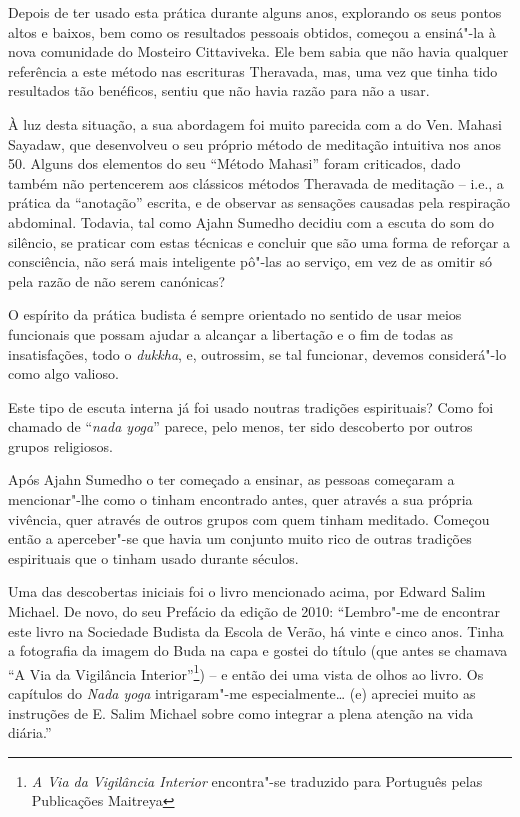 Depois de ter usado esta prática durante alguns anos, explorando os seus
pontos altos e baixos, bem como os resultados pessoais obtidos, começou
a ensiná"-la à nova comunidade do Mosteiro Cittaviveka. Ele bem sabia que
não havia qualquer referência a este método nas escrituras Theravada,
mas, uma vez que tinha tido resultados tão benéficos, sentiu que não
havia razão para não a usar.

À luz desta situação, a sua abordagem foi muito parecida com a do Ven.
Mahasi Sayadaw, que desenvolveu o seu próprio método de meditação
intuitiva nos anos 50. Alguns dos elementos do seu ``Método Mahasi''
foram criticados, dado também não pertencerem aos clássicos métodos
Theravada de meditação -- i.e., a prática da ``anotação'' escrita, e de
observar as sensações causadas pela respiração abdominal. Todavia, tal
como Ajahn Sumedho decidiu com a escuta do som do silêncio, se praticar
com estas técnicas e concluir que são uma forma de reforçar a
consciência, não será mais inteligente pô"-las ao serviço, em vez de as
omitir só pela razão de não serem canónicas?

O espírito da prática budista é sempre orientado no sentido de usar
meios funcionais que possam ajudar a alcançar a libertação e o fim de
todas as insatisfações, todo o \emph{dukkha}, e, outrossim, se tal
funcionar, devemos considerá"-lo como algo valioso.

\smallskip

 Este tipo de escuta interna já foi usado noutras tradições
espirituais? Como foi chamado de ``\emph{nada yoga}'' parece, pelo
menos, ter sido descoberto por outros grupos religiosos.

 Após Ajahn Sumedho o ter começado a ensinar, as pessoas começaram a
mencionar"-lhe como o tinham encontrado antes, quer através a sua própria
vivência, quer através de outros grupos com quem tinham meditado.
Começou então a aperceber"-se que havia um conjunto muito rico de outras
tradições espirituais que o tinham usado durante séculos.

Uma das descobertas iniciais foi o livro mencionado acima, por Edward Salim
Michael. De novo, do seu Prefácio da edição de 2010: ``Lembro"-me de encontrar
este livro na Sociedade Budista da Escola de Verão, há vinte e cinco anos. Tinha
a fotografia da imagem do Buda na capa e gostei do título (que antes se chamava
``A Via da Vigilância Interior''\footnote{\emph{A Via da Vigilância Interior}
  encontra"-se traduzido para Português pelas Publicações Maitreya}) -- e então
dei uma vista de olhos ao livro. Os capítulos do \emph{Nada yoga} intrigaram"-me
especialmente\ldots{} (e) apreciei muito as instruções de E. Salim Michael sobre
como integrar a plena atenção na vida diária.''

